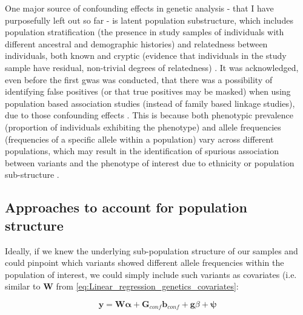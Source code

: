 One major source of confounding effects in genetic analysis - that I have purposefully left out so far -  is latent population substructure, which includes population stratification (the presence in study samples of individuals with different ancestral and demographic histories) and relatedness between individuals, both known and cryptic (evidence that individuals in the study sample have residual, non-trivial degrees of relatedness) \cite{mccarthy2008genome}.
It was acknowledged, even before the first \gls{gwas} was conducted, that there was a possibility of identifying false positives (or that true positives may be masked) when using population based association studies (instead of family based linkage studies), due to those confounding effects \cite{burton2005key}. 
This is because both phenotypic prevalence (proportion of individuals exhibiting the phenotype) and allele frequencies (frequencies of a specific allele within a population) vary across different populations, which may result in the identification of spurious association between variants and the phenotype of interest due to ethnicity or population sub-structure \cite{burton2005key}.


\subsection{Approaches to account for population structure}
\label{sec:pop_struct_noLMM}


Ideally, if we knew the underlying sub-population structure of our samples and could pinpoint which variants showed different allele frequencies within the population of interest, we could simply include such variants as covariates (i.e. similar to $\mathbf{W}$ from \eqref{eq:Linear_regression_genetics_covariates}:

\begin{equation}\label{eq:LM_G_confounding}
    \mathbf{y} =  \mathbf{W}\boldsymbol{\alpha} +  \mathbf{G}_{conf}\mathbf{b}_{conf} + \mathbf{g}\beta + \boldsymbol{\psi} 
\end{equation}

